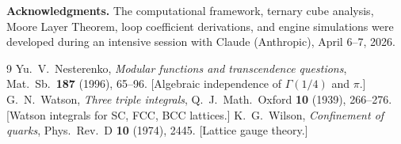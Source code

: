 \documentclass[12pt,letterpaper]{article}
\begin{document}
\bigskip
\noindent\textbf{Acknowledgments.} The computational framework, ternary cube analysis, Moore Layer Theorem, loop coefficient derivations, and engine simulations were developed during an intensive session with Claude (Anthropic), April 6--7, 2026.

\begin{thebibliography}{9}
 Yu.~V.~Nesterenko, \emph{Modular functions and transcendence questions}, Mat.~Sb.~\textbf{187} (1996), 65--96. [Algebraic independence of $\Gamma(1/4)$ and $\pi$.]
 G.~N.~Watson, \emph{Three triple integrals}, Q.~J.~Math.~Oxford \textbf{10} (1939), 266--276. [Watson integrals for SC, FCC, BCC lattices.]
 K.~G.~Wilson, \emph{Confinement of quarks}, Phys.~Rev.~D \textbf{10} (1974), 2445. [Lattice gauge theory.]
\end{thebibliography}
\end{document}
